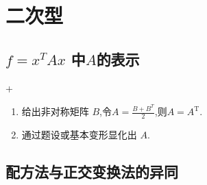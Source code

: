 \chapter{二次型}
\section{$f=x^TAx$ 中$A$的表示}
\DOne+\DTwoThree

\begin{enumerate}
    \item 给出非对称矩阵 $B$,令$A=\frac{B+B^T}{2}$,则$A=A^\mathrm{T}.$
    \item 通过题设或基本变形显化出 $A.$
\end{enumerate}

\section{配方法与正交变换法的异同}

